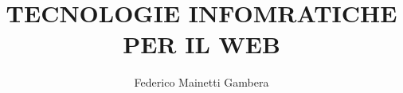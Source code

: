   
\title{TECNOLOGIE INFOMRATICHE PER IL WEB}
\author{Federico Mainetti Gambera}
\usepackage{amsmath}
\usepackage{amssymb}
\usepackage{graphicx}
\usepackage[italian]{babel}
\usepackage{import}
\usepackage{xifthen}
\usepackage{pdfpages}
\usepackage{transparent}
\usepackage{xcolor}
\usepackage[a4paper,left=35mm,top=26mm,right=26mm,bottom=15mm]{geometry}
\usepackage{color}
\usepackage{tcolorbox}
\usepackage{hyperref}
\renewcommand{\familydefault}{\sfdefault}

\newcommand{\incfig}[1]{%
    \def\svgwidth{\columnwidth}
    {#1.pdf_tex}
}